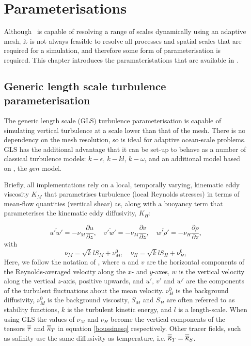 \chapter{Parameterisations}\label{chap:parameterisations}

Although \fluidity\ is capable of resolving a range of scales dynamically using
an adaptive mesh, it is not always feasible to resolve all processes and spatial scales that are
required for a simulation, and therefore some form of parameterisation is required.
This chapter introduces the paramateristations that are available in \fluidity.

\section{Generic length scale turbulence parameterisation}\label{Sect:GLS}

The generic length scale (GLS) turbulence parameterisation is capable of simulating vertical
turbulence at a scale lower than that of the mesh. There is no dependency on the mesh resolution,
so is ideal for adaptive ocean-scale problems. GLS has the additional advantage that it
can be set-up to behave as a number of classical turbulence models:
$k-\epsilon$, $k-kl$, $k-\omega$,
and an additional model based on \citet{umlauf2003}, the $gen$ model.

Briefly, all implementations rely on a local, temporally varying, kinematic eddy
viscosity $K_M$ that parametrises turbulence (local Reynolds stresses) in terms of mean-flow
quantities (vertical shear) as, along
with a buoyancy term that parameterises the kinematic eddy diffusivity, $K_H$:

\begin{equation}
\overline{u'w'} = -\nu_M\frac{\partial u}{\partial z},\quad
\overline{v'w'} = -\nu_M\frac{\partial v}{\partial z},\quad
\overline{w'\rho'} = -\nu_H\frac{\partial\rho}{\partial z},
\end{equation}
with
\begin{equation}
\nu_M = \sqrt{k}lS_{M}+\nu_M^0, \quad
\nu_H = \sqrt{k}lS_{H}+\nu_H^0,
\label{eq:diff}
\end{equation}
Here, we follow the notation of \citet{umlauf2003}, where $u$ and $v$ are the 
horizontal components of the Reynolds-averaged velocity along the $x$- and $y$-axes, 
$w$ is the vertical velocity along the vertical $z$-axis, positive upwards, and 
$u'$, $v'$ and $w'$ are the components of the turbulent fluctuations about the 
mean velocity. $\nu_H^0$ is the background diffusivity, $\nu_M^0$ is the background viscosity, 
$S_{M}$ and $S_{H}$ are often referred to as stability functions, $k$ is the turbulent kinetic energy,
and $l$ is a length-scale. When using GLS the values of $\nu_M$ and $\nu_H$ become the 
vertical components of the tensors $\overline{\overline{\tau}}$ and $\overline{\overline{\kappa}}_T$ 
in equation \ref{boussinesq} respectively. Other tracer fields, such as 
salinity use the same diffusivity as temperature, i.e. $\overline{\overline{\kappa}}_T = \overline{\overline{\kappa}}_S$.


